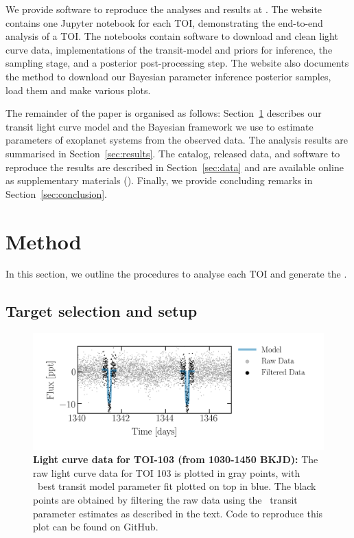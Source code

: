 \documentclass[floatfix,ApJL,twocolumn]{aastex631}
\begin{document}
We provide software to reproduce the analyses and results at \atlasUrl.
The website contains one Jupyter notebook for each TOI, demonstrating the end-to-end analysis of a TOI.
The notebooks contain software to download and clean light curve data, implementations of the transit-model and priors for inference, the \pymc sampling stage, and a posterior post-processing step.
The website also documents the method to download our Bayesian parameter inference posterior samples, load them and make various plots.


The remainder of the paper is organised as follows: Section~\ref{sec:method} describes our transit light curve model and the Bayesian framework we use to estimate parameters of exoplanet systems from the observed data.
The analysis results are summarised in Section~\ref{sec:results}.
The catalog, released data, and software to reproduce the results are described in Section~\ref{sec:data} and are available online as supplementary materials (\atlasUrl).
Finally, we provide concluding remarks in Section~\ref{sec:conclusion}.

\section{Method} \label{sec:method}

In this section, we outline the procedures to analyse each TOI and generate the \tessAtlas. 


\subsection{Target selection and setup }

\begin{figure}
    \includegraphics[width=\linewidth]{figures/raw_data_toi_103.png}
    \caption{\textbf{Light curve data for TOI-103 (from 1030-1450 BKJD):} The raw light curve data for TOI 103 is plotted in gray points, with \exofop\ best transit model parameter fit plotted on top in blue. The black points are obtained by filtering the raw data using the \exofop\ transit parameter estimates as described in the text. Code to reproduce this plot can be found on GitHub. }
    \label{fig:}
\end{figure}
\end{document}
